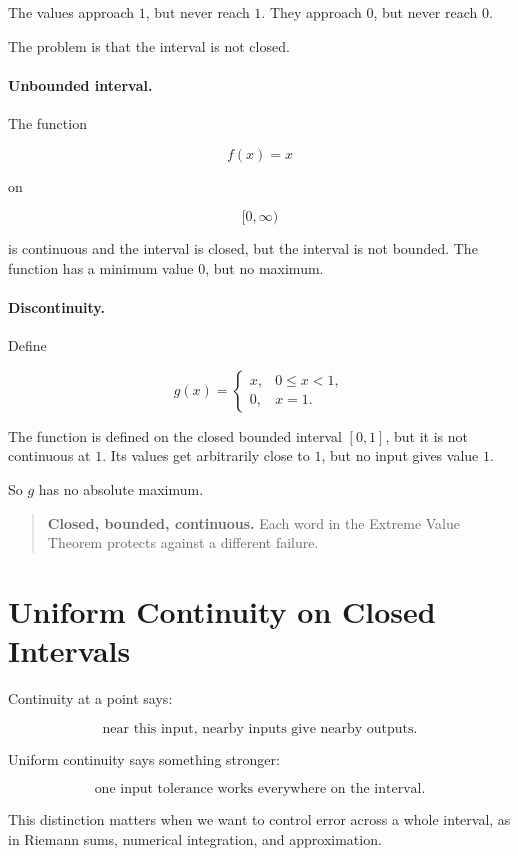 The values approach \(1\), but never reach \(1\).  They approach \(0\), but never reach
\(0\).

The problem is that the interval is not closed.

\paragraph{Unbounded interval.}
The function

\[
f(x)=x
\]

on

\[
[0,\infty)
\]

is continuous and the interval is closed, but the interval is not bounded.  The function
has a minimum value \(0\), but no maximum.

\paragraph{Discontinuity.}
Define

\[
g(x)=
\begin{cases}
x, & 0\le x<1,\\
0, & x=1.
\end{cases}
\]

The function is defined on the closed bounded interval \([0,1]\), but it is not
continuous at \(1\).  Its values get arbitrarily close to \(1\), but no input gives value
\(1\).

So \(g\) has no absolute maximum.

\begin{quote}
\textbf{Closed, bounded, continuous.}
Each word in the Extreme Value Theorem protects against a different failure.
\end{quote}

\section{Uniform Continuity on Closed Intervals}
\label{appsec:uniform-continuity}

Continuity at a point says:

\[
\text{near this input, nearby inputs give nearby outputs.}
\]

Uniform continuity says something stronger:

\[
\text{one input tolerance works everywhere on the interval.}
\]

This distinction matters when we want to control error across a whole interval, as in
Riemann sums, numerical integration, and approximation.

